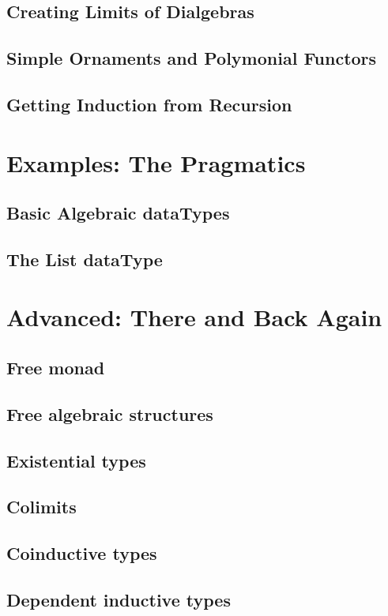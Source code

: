 \documentclass[11pt,oneside]{article}
\begin{document}
\subsection{Creating Limits of Dialgebras}
\subsection{Simple Ornaments and Polymonial Functors}
\subsection{Getting Induction from Recursion}

\section{Examples: The Pragmatics}
\subsection{Basic Algebraic dataTypes}
\subsection{The List dataType}

\section{Advanced: There and Back Again}
\subsection{Free monad}
\subsection{Free algebraic structures}
\subsection{Existential types}
\subsection{Colimits}
\subsection{Coinductive types}
\subsection{Dependent inductive types}
\end{document}
